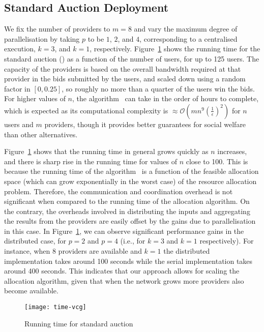 \subsection{Standard Auction Deployment}

We fix the number of providers to $m=8$ and vary the maximum degree of parallelisation 
by taking $p$ to be $1$, $2$, and $4$, corresponding to a centralised execution, $k=3$, and $k=1$, respectively.
Figure~\ref{fig:standard-auction-time} shows the running time for the standard 
auction () as a function of the number of users, for up to 125 users.
The capacity of the providers is based on the overall bandwidth required at that provider in the bids submitted by the users, and scaled down using a random factor in $[0, 0.25]$, so roughly no more than a quarter of the users win the bids. 
For higher values of $n$, the algorithm~\cite{Zhang2015Truthful} can take in the order of hours to complete, 
which is expected as its computational complexity is $\approx \mathcal{O}(mn^9(\frac{1}{\epsilon})^2)$ for $n$ users and $m$ providers, though it provides better guarantees for social welfare than other alternatives.

Figure~\ref{fig:standard-auction-time} shows that the running time in general grows quickly as $n$ increases, and there is sharp rise in the running time for values of $n$ close to 100.
This is because the running time of the algorithm~\cite{Zhang2015Truthful} is 
a function of the feasible allocation space (which can grow exponentially in the worst case) of the resource allocation problem.
Therefore, the communication and coordination overhead is not significant when compared to the running time of the allocation algorithm. 
On the contrary, the overheads involved in distributing the inputs and aggregating the results from the providers are easily offset by the gains due to parallelisation in this case. 
In Figure~\ref{fig:standard-auction-time},  we can observe significant performance 
gains in the distributed case, for $p=2$ and $p=4$ (i.e., for $k=3$ and $k=1$ respectively). 
For instance, when 8 providers are available and $k=1$ the distributed implementation
takes around 100 seconds while the serial implementation takes around 400 seconds. 
This indicates that our approach allows for scaling the allocation algorithm, 
given that when the network grows more providers also become available.

\begin{figure}[tbp]
	\centering
	\texttt{[image: time-vcg]}
	\caption{Running time for standard auction}
	\label{fig:standard-auction-time}
\end{figure}
